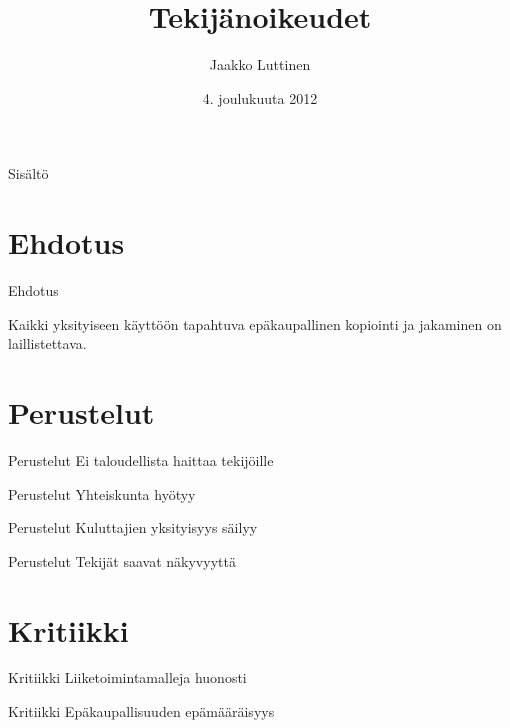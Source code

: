 \documentclass{beamer}
\title{Tekijänoikeudet}
\author{
  Jaakko Luttinen
}
\date{4. joulukuuta 2012}
\begin{document}
\maketitle

\begin{frame}{Sisältö}
  \tableofcontents
\end{frame}


\section{Ehdotus}

\begin{frame}{Ehdotus}

  \Large Kaikki yksityiseen käyttöön tapahtuva epäkaupallinen
  kopiointi ja jakaminen on laillistettava.
  
\end{frame}

\section{Perustelut}

\begin{frame}{Perustelut}
  \Large
  Ei taloudellista haittaa tekijöille
\end{frame}

\begin{frame}{Perustelut}
  \Large
  Yhteiskunta hyötyy
\end{frame}

\begin{frame}{Perustelut}
  \Large
  Kuluttajien yksityisyys säilyy
\end{frame}

\begin{frame}{Perustelut}
  \Large
  Tekijät saavat näkyvyyttä
\end{frame}

\section{Kritiikki}

\begin{frame}{Kritiikki}
  \Large
  Liiketoimintamalleja huonosti
\end{frame}

\begin{frame}{Kritiikki}
  \Large 
  Epäkaupallisuuden epämääräisyys
\end{frame}
\end{document}
